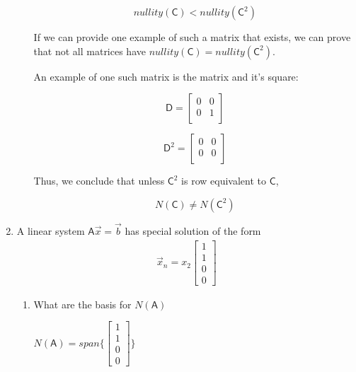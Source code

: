 \documentclass[a4paper, 11pt]{article}
\newcommand{\mat}[1]{\boldsymbol { \mathsf{#1}} }
\begin{document}
\begin{enumerate}
\begin{enumerate}[label=\alph*]
	    \begin{equation*}
	        nullity(\mat{C}) < nullity(\mat{C}^2)
	    \end{equation*}
	    
	    If we can provide one example of such a matrix that exists, we can prove that not all matrices have $nullity(\mat{C}) = nullity(\mat{C}^2)$.
	    
	    An example of one such matrix is the matrix and it's square:
	    
	    \begin{equation*}
	        \mat{D} = 
	        \begin{bmatrix}
	            0 & 0 \\
	            0 & 1 \\
	        \end{bmatrix}
	    \end{equation*}
	 
	    \begin{equation*}
	        \mat{D}^2 = 
	        \begin{bmatrix}
	            0 & 0 \\
	            0 & 0 \\
	        \end{bmatrix}
	    \end{equation*}
	    
	    Thus, we conclude that unless $\mat{C}^2$ is row equivalent to $\mat{C}$,
	    
	    \begin{equation*}
            N(\mat{C}) \neq N(\mat{C}^2)
	    \end{equation*}
	    
	    \end{enumerate}
    
\item A linear system $\mat A \vec x = \vec b$ has special solution of the form
\begin{align}
 \vec x_n = x_2 \begin{bmatrix} 1 \\ 1 \\ 0 \\ 0 \end{bmatrix}
 \end{align} 
\begin{enumerate}[label=(\alph*)]
\item What are the basis for $N(\mat A)$
	
	$N(\mat A) = span \{ \begin{bmatrix} 1 \\ 1 \\ 0 \\ 0 \end{bmatrix} \}$
	

\end{enumerate}
\end{enumerate}
\end{document}
